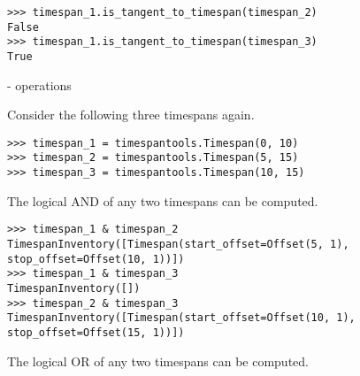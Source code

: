 \begin{comment}
<abjad>
timespan_1.is_tangent_to_timespan(timespan_2)
timespan_1.is_tangent_to_timespan(timespan_3)
</abjad>
\end{comment}

\begin{singlespacing}
\begin{lstlisting}
>>> timespan_1.is_tangent_to_timespan(timespan_2)
False
>>> timespan_1.is_tangent_to_timespan(timespan_3)
True
\end{lstlisting}
\end{singlespacing}

- operations

Consider the following three timespans again.

\begin{comment}
<abjad>
timespan_1 = timespantools.Timespan(0, 10)
timespan_2 = timespantools.Timespan(5, 15)
timespan_3 = timespantools.Timespan(10, 15)
</abjad>
\end{comment}

\begin{singlespacing}
\begin{lstlisting}
>>> timespan_1 = timespantools.Timespan(0, 10)
>>> timespan_2 = timespantools.Timespan(5, 15)
>>> timespan_3 = timespantools.Timespan(10, 15)
\end{lstlisting}
\end{singlespacing}

The logical AND of any two timespans can be computed.

\begin{comment}
<abjad>
timespan_1 & timespan_2
timespan_1 & timespan_3
timespan_2 & timespan_3
</abjad>
\end{comment}

\begin{singlespacing}
\begin{lstlisting}
>>> timespan_1 & timespan_2
TimespanInventory([Timespan(start_offset=Offset(5, 1), stop_offset=Offset(10, 1))])
>>> timespan_1 & timespan_3
TimespanInventory([])
>>> timespan_2 & timespan_3
TimespanInventory([Timespan(start_offset=Offset(10, 1), stop_offset=Offset(15, 1))])
\end{lstlisting}
\end{singlespacing}

The logical OR of any two timespans can be computed.

